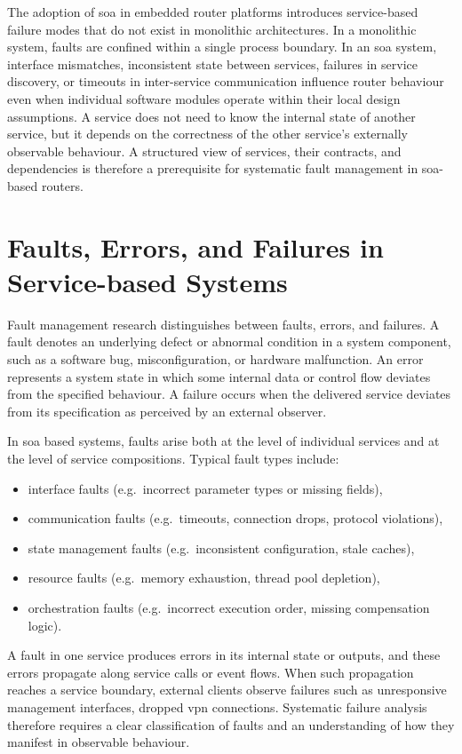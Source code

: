 The adoption of \gls{soa} in embedded router platforms introduces service-based failure modes that do not exist in monolithic architectures. In a monolithic system, faults are confined within a single process boundary. In an \gls{soa} system, interface mismatches, inconsistent state between services, failures in service discovery, or timeouts in inter-service communication influence router behaviour even when individual software modules operate within their local design assumptions. A service does not need to know the internal state of another service, but it depends on the correctness of the other service's externally observable behaviour. A structured view of services, their contracts, and dependencies is therefore a prerequisite for systematic fault management in \gls{soa}-based routers.

\section{Faults, Errors, and Failures in Service-based Systems}\label{sec:faults-errors-failures}

Fault management research distinguishes between faults, errors, and failures. A fault denotes an underlying defect or abnormal condition in a system component, such as a software bug, misconfiguration, or hardware malfunction. An error represents a system state in which some internal data or control flow deviates from the specified behaviour. A failure occurs when the delivered service deviates from its specification as perceived by an external observer.

In \gls{soa} based systems, faults arise both at the level of individual services and at the level of service compositions. Typical fault types include:

\begin{itemize}
\item interface faults (e.g.\ incorrect parameter types or missing fields),
\item communication faults (e.g.\ timeouts, connection drops, protocol violations),
\item state management faults (e.g.\ inconsistent configuration, stale caches),
\item resource faults (e.g.\ memory exhaustion, thread pool depletion),
\item orchestration faults (e.g.\ incorrect execution order, missing compensation logic).
\end{itemize}

A fault in one service produces errors in its internal state or outputs, and these errors propagate along service calls or event flows. When such propagation reaches a service boundary, external clients observe failures such as unresponsive management interfaces, dropped \gls{vpn} connections. Systematic failure analysis therefore requires a clear classification of faults and an understanding of how they manifest in observable behaviour.

